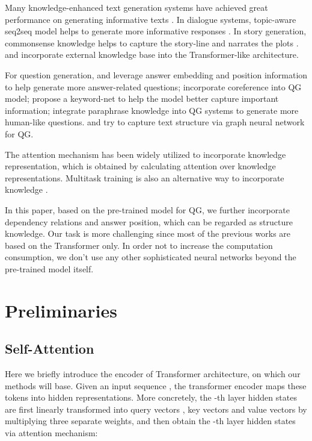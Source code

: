 \documentclass[11pt]{article}
\begin{document}
Many knowledge-enhanced text generation systems have achieved great performance on generating informative texts \cite{yu2020survey}. In dialogue systems, topic-aware seq2seq model helps to generate more informative responses \citep{mou-etal-2016-sequence, Xing_Wu_Wu_Liu_Huang_Zhou_Ma_2017, ijcai2018-0643}. In story generation, commonsense knowledge helps to capture the story-line and narrates the plots \citep{Guan_Wang_Huang_2019}.
\citet{Liu_Zhou_Zhao_Wang_Ju_Deng_Wang_2020} and \citet{Huang_Fu_Mo_Cai_Xu_Li_Li_Leung_2021} incorporate external knowledge base into the Transformer-like architecture.

For question generation, \citet{zhou2017neural} and \citet{sun-etal-2018-answer} leverage answer embedding and position information to help generate more answer-related questions; \citet{du-cardie-2018-harvesting} incorporate coreference into QG model; \citet{Kim_Lee_Shin_Jung_2019} propose a keyword-net to help the model better capture important information; \citet{jia-etal-2020-ask} integrate paraphrase knowledge into QG systems to generate more human-like questions. 
\citet{Chen2020Reinforcement} and  \citet{pan-etal-2020-semantic} try to capture text structure via graph neural network for QG.  

The attention mechanism has been widely utilized to incorporate knowledge representation, 
which is obtained by calculating attention over knowledge representations. Multitask training is also an alternative way to incorporate knowledge \citep{Kim2020Sequential, jia-etal-2020-ask}. 

In this paper, based on the pre-trained model for QG, we further incorporate dependency relations and answer position, which can be regarded as structure knowledge. Our task is more challenging
since 
most of the previous works are based on the Transformer only. In order not to increase the computation consumption, we don't use any other sophisticated neural networks beyond the pre-trained model itself.

\section{Preliminaries}
\subsection{Self-Attention}
Here we briefly introduce the encoder of Transformer architecture, on which our methods will base.
Given an input sequence , the transformer encoder maps these tokens into hidden representations. More concretely, the -th layer hidden states are first linearly transformed into query vectors , key vectors  and value vectors  by multiplying three separate weights,
and then obtain the -th layer hidden states via attention mechanism:
\end{document}
